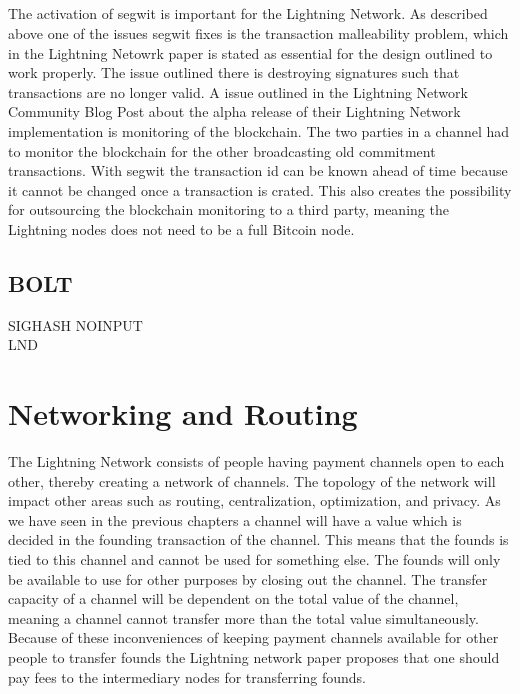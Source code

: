 \documentclass[informationsecurity]{gucmasterproject}
\begin{document}
\paragraph{}
The activation of segwit is important for the Lightning Network. As described above one of the issues segwit fixes is the transaction malleability problem, which in the Lightning Netowrk paper \cite{poon2015bitcoin} is stated as essential for the design outlined to work properly. The issue outlined there is destroying signatures such that transactions are no longer valid. A issue outlined in the Lightning Network Community Blog Post\cite{LN_segwit} about the alpha release of their Lightning Network implementation is monitoring of the blockchain. The two parties in a channel had to monitor the blockchain for the other broadcasting old commitment transactions. With segwit the transaction id can be known ahead of time because it cannot be changed once a transaction is crated. This also creates the possibility for outsourcing the blockchain monitoring to a third party, meaning the Lightning nodes does not need to be a full Bitcoin node.

\section{BOLT}


SIGHASH NOINPUT \\
LND \\


\chapter{Networking and Routing}

The Lightning Network consists of people having payment channels open to each other, thereby creating a network of channels. The topology of the network will impact other areas such as routing, centralization, optimization, and privacy.  As we have seen in the previous chapters a channel will have a value which is decided in the founding transaction of the channel. This means that  the founds is tied to this channel and cannot be used for something else. The founds will only be available to use for other purposes by closing out the channel. The transfer capacity of a channel will be dependent on the total value of the channel, meaning a channel cannot transfer more than the total value simultaneously. Because of these inconveniences of keeping payment channels available for other people to transfer founds the Lightning network paper\cite{poon2015bitcoin} proposes that one should pay fees to the intermediary nodes for transferring founds. 
\end{document}
